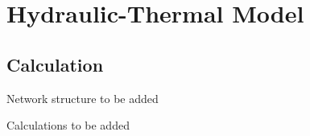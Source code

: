 \documentclass[xcolor=dvipsnames]{beamer}
\begin{document}

\section{Hydraulic-Thermal Model}

\subsection{Calculation}

\begin{frame}{Network structure}
	to be added
\end{frame}

\begin{frame}{Calculations}
		to be added
\end{frame}
\end{document}
